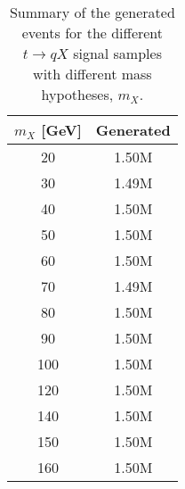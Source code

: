 \begin{table}[htbp]
    \small	
    \begin{tabular}{cc}
    \toprule\toprule
    $m_X$ [GeV] & Generated \\ \midrule
    20  & 1.50M \\
    30  & 1.49M \\
    40  & 1.50M \\
    50  & 1.50M \\
    60  & 1.50M \\
    70  & 1.49M \\
    80  & 1.50M \\
    90  & 1.50M \\
    100 & 1.50M \\
    120 & 1.50M \\
    140 & 1.50M \\
    150 & 1.50M \\
    160 & 1.50M \\

    \bottomrule\bottomrule  
    \end{tabular}                            
    \caption{Summary of the generated events for the different $t\to qX$ signal samples with different mass hypotheses, $m_X$.}
    \label{tqX:signalsummarytable}
\end{table}

\clearpage




